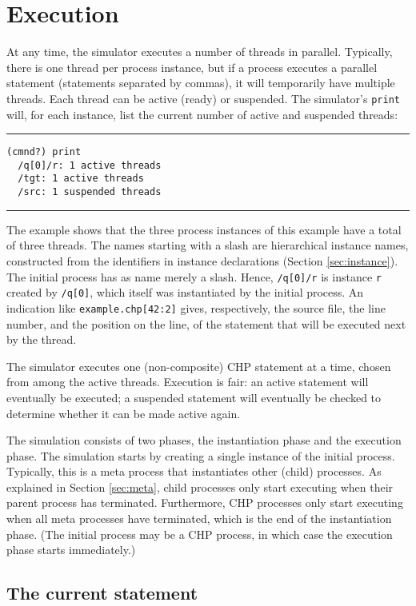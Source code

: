 \section{Execution}\label{sec:exec}

At any time, the simulator executes a number of threads in parallel.
Typically, there is one thread per process instance, but if a process
executes a parallel statement (statements separated by commas), it will
temporarily have multiple threads. Each thread can be active (ready) or suspended.
The simulator's \verb|print| will, for each instance, list the current number of
active and suspended threads:
\medskip
\hrule
\begin{verbatim}
(cmnd?) print
  /q[0]/r: 1 active threads
  /tgt: 1 active threads
  /src: 1 suspended threads
\end{verbatim}
\hrule
\medskip
The example shows that the three process instances of this example have
a total of three threads.
The names starting with a slash are hierarchical
instance names, constructed from the identifiers in instance declarations
(Section \ref{sec:instance}). The initial process has as name merely a slash.
Hence, \verb|/q[0]/r| is instance \verb|r| created by \verb|/q[0]|, which itself was
instantiated by the initial process.
An indication like \verb|example.chp[42:2]|
gives, respectively, the source file, the line number, and the position on the
line, of the statement that will be executed next by the thread.

The simulator executes one (non-composite) CHP statement at a time, chosen from
among the active threads. Execution is fair: an active statement will
eventually be executed; a suspended statement will eventually be checked
to determine whether it can be made active again.

The simulation consists of two phases, the instantiation phase and
the execution phase. The simulation starts by creating a single instance
of the initial process. Typically, this is a meta process that instantiates
other (child) processes. As explained in Section \ref{sec:meta}, child processes
only start executing when their parent process has terminated. Furthermore,
CHP processes only start executing when all meta processes have
terminated, which is the end of the instantiation phase. (The initial
process may be a CHP process, in which case the execution phase
starts immediately.)

\subsection{The current statement}\label{sec:currstmt}

